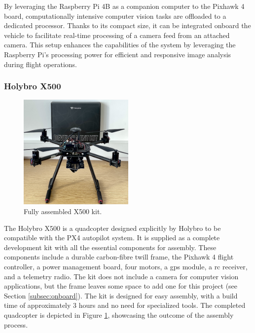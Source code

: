 By leveraging the Raspberry Pi 4B as a companion computer to the Pixhawk 4 board, computationally intensive computer vision tasks are offloaded to a dedicated processor. Thanks to its compact size, it can be integrated onboard the vehicle to facilitate real-time processing of a camera feed from an attached camera. This setup enhances the capabilities of the system by leveraging the Raspberry Pi's processing power for efficient and responsive image analysis during flight operations.



\subsubsection{Holybro X500}
\label{subsec:x500}

\begin{figure}[H]
  \centering
  \includegraphics[width=0.5\textwidth,keepaspectratio]{img/X500-assembled.jpg}
  \caption{Fully assembled X500 kit.}
  \label{fig:x500}
\end{figure}

The Holybro X500 \cite{x500-front} is a quadcopter designed explicitly by Holybro to be compatible with the PX4 autopilot system. It is supplied as a complete development kit with all the essential components for assembly. These components include a durable carbon-fibre twill frame, the Pixhawk 4 flight controller, a power management board, four motors, a \acrshort{gps} module, a \acrfull{rc} receiver, and a telemetry radio. The kit does not include a camera for computer vision applications, but the frame leaves some space to add one for this project (see Section \ref{subsec:onboard}). The kit is designed for easy assembly, with a build time of approximately 3 hours and no need for specialized tools. The completed quadcopter is depicted in Figure \ref{fig:x500}, showcasing the outcome of the assembly process.


